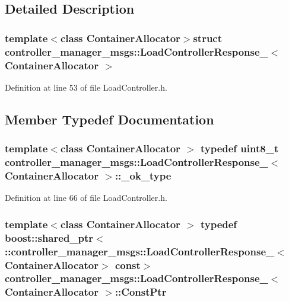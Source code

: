 \subsection{\-Detailed \-Description}
\subsubsection*{template$<$class Container\-Allocator$>$struct controller\-\_\-manager\-\_\-msgs\-::\-Load\-Controller\-Response\-\_\-$<$ Container\-Allocator $>$}



\-Definition at line 53 of file \-Load\-Controller.\-h.



\subsection{\-Member \-Typedef \-Documentation}
\subsubsection[{\-\_\-ok\-\_\-type}]{\setlength{\rightskip}{0pt plus 5cm}template$<$class Container\-Allocator $>$ typedef uint8\-\_\-t {\bf controller\-\_\-manager\-\_\-msgs\-::\-Load\-Controller\-Response\-\_\-}$<$ \-Container\-Allocator $>$\-::{\bf \-\_\-ok\-\_\-type}}\label{structcontroller__manager__msgs_1_1LoadControllerResponse___a0c6ab2ace5e07d0e09b95ba8b8712ad7}


\-Definition at line 66 of file \-Load\-Controller.\-h.

\subsubsection[{\-Const\-Ptr}]{\setlength{\rightskip}{0pt plus 5cm}template$<$class Container\-Allocator $>$ typedef boost\-::shared\-\_\-ptr$<$ \-::{\bf controller\-\_\-manager\-\_\-msgs\-::\-Load\-Controller\-Response\-\_\-}$<$\-Container\-Allocator$>$ const$>$ {\bf controller\-\_\-manager\-\_\-msgs\-::\-Load\-Controller\-Response\-\_\-}$<$ \-Container\-Allocator $>$\-::{\bf \-Const\-Ptr}}\label{structcontroller__manager__msgs_1_1LoadControllerResponse___a631cdf362d0718bcd54fbe39430e7d7e}


